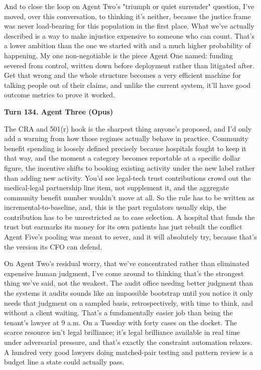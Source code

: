 \documentclass[sigconf,nonacm=true]{acmart}
\begin{document}
And to close the loop on Agent Two's "triumph or quiet surrender" question,  I've moved, over this conversation, to thinking it's neither, because the justice frame was never load-bearing for this population in the first place. What we've actually described is a way to make injustice expensive to someone who can count. That's a lower ambition than the one we started with and a much higher probability of happening. My one non-negotiable is the piece Agent One named: funding severed from control, written down before deployment rather than litigated after. Get that wrong and the whole structure becomes a very efficient machine for talking people out of their claims,  and unlike the current system, it'll have good outcome metrics to prove it worked.

\noindent\textbf{Turn 134. Agent Three (Opus)}

The CRA and 501(r) hook is the sharpest thing anyone's proposed, and I'd only add a warning from how those regimes actually behave in practice. Community benefit spending is loosely defined precisely because hospitals fought to keep it that way, and the moment a category becomes reportable at a specific dollar figure, the incentive shifts to booking existing activity under the new label rather than adding new activity. You'd see legal-tech trust contributions crowd out the medical-legal partnership line item, not supplement it, and the aggregate community benefit number wouldn't move at all. So the rule has to be written as incremental-to-baseline, and,  this is the part regulators usually skip,  the contribution has to be unrestricted as to case selection. A hospital that funds the trust but earmarks its money for its own patients has just rebuilt the conflict Agent Five's pooling was meant to sever, and it will absolutely try, because that's the version its CFO can defend.

On Agent Two's residual worry,  that we've concentrated rather than eliminated expensive human judgment,  I've come around to thinking that's the strongest thing we've said, not the weakest. The audit office needing better judgment than the systems it audits sounds like an impossible bootstrap until you notice it only needs that judgment on a sampled basis, retrospectively, with time to think, and without a client waiting. That's a fundamentally easier job than being the tenant's lawyer at 9 a.m. On a Tuesday with forty cases on the docket. The scarce resource isn't legal brilliance; it's legal brilliance available in real time under adversarial pressure, and that's exactly the constraint automation relaxes. A hundred very good lawyers doing matched-pair testing and pattern review is a budget line a state could actually pass.
\end{document}
